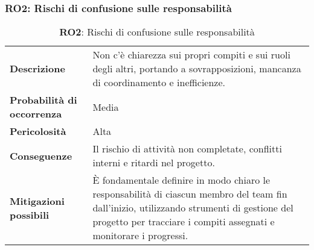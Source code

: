 \subsubsection{RO2: Rischi di confusione sulle responsabilità}
\begin{table}[h!]
    \centering
    \renewcommand{\arraystretch}{1.5} %
    \begin{tabularx}{\textwidth}{|X|X|}\hline
    \rowcolor[HTML]{FFD700} 
    \multicolumn{2}{|c|}{\textbf{Rischi di confusione sulle responsabilità}} \\ \hline
    \textbf{Descrizione} & Non c'è chiarezza sui propri compiti e sui ruoli degli altri, portando a sovrapposizioni, 
    mancanza di coordinamento e inefficienze. \\ \hline
    \textbf{Probabilità di occorrenza} & Media \\ \hline
    \textbf{Pericolosità} & Alta\\ \hline
    \textbf{Conseguenze} & Il rischio di attività non completate, conflitti interni e ritardi nel progetto. \\ \hline
    \textbf{Mitigazioni possibili} & È fondamentale definire in modo chiaro le responsabilità di ciascun membro del team fin dall'inizio, 
    utilizzando strumenti di gestione del progetto per tracciare i compiti assegnati e monitorare i progressi.  \\ \hline
    \end{tabularx}
    \caption{\textbf{RO2}: Rischi di confusione sulle responsabilità}
    \end{table}

\newpage

